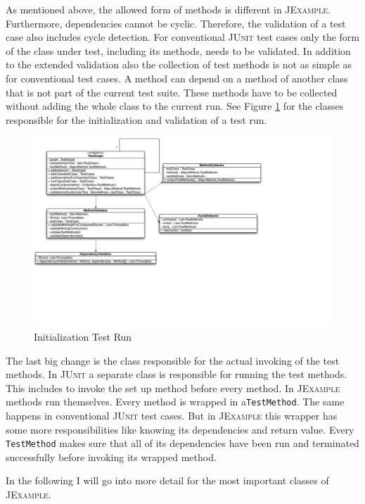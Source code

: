 \documentclass[11pt,a4paper,pdftex]{article}
\newcommand{\JUnit}{\textsc{JUnit}\xspace}
\newcommand{\JExample}{\textsc{JExample}\xspace}
\newcommand{\ttt}[1]{\texttt{#1}}
\begin{document}
As mentioned above, the allowed form of methods is different in \JExample. Furthermore, dependencies cannot be cyclic. Therefore, the validation of a test case also includes cycle detection. For conventional \JUnit test cases only the form of the class under test, including its methods, needs to be validated. In addition to the extended validation also the collection of test methods is not as simple as for conventional test cases. A method can depend on a method of another class that is not part of the current test suite. These methods have to be collected without adding the whole class to the current run.
See Figure \ref{fig:classDiagInit} for the classes responsible for the initialization and validation of a test run.

\begin{figure}[htbp]
 \includegraphics[width=20.0cm]{classdiagramInit.pdf}
 \caption{Initialization Test Run}
 \label{fig:classDiagInit}
\end{figure}

The last big change is the class responsible for the actual invoking of the test methods. In \JUnit a separate class is responsible for running the test methods. This includes to invoke the set up method before every method. In \JExample methods run themselves. Every method is wrapped in a\ttt{TestMethod}. The same happens in conventional \JUnit test cases. But in \JExample this wrapper has some more responsibilities like knowing its dependencies and return value. Every \ttt{TestMethod} makes sure that all of its dependencies have been run and terminated successfully before invoking its wrapped method.

In the following I will go into more detail for the most important classes of \JExample.
\end{document}
